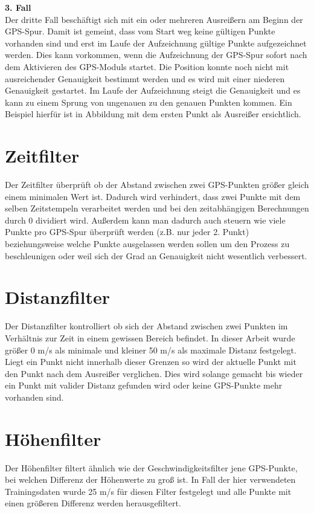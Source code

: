 
\textbf{3. Fall}\\
Der dritte Fall beschäftigt sich mit ein oder mehreren Ausreißern am Beginn der GPS-Spur. Damit ist gemeint, dass vom Start weg keine gültigen Punkte vorhanden sind und erst im Laufe der Aufzeichnung gültige Punkte aufgezeichnet werden. Dies kann vorkommen, wenn die Aufzeichnung der GPS-Spur sofort nach dem Aktivieren des GPS-Moduls startet. Die Position konnte noch nicht mit ausreichender Genauigkeit bestimmt werden und es wird mit einer niederen Genauigkeit gestartet. Im Laufe der Aufzeichnung steigt die Genauigkeit und es kann zu einem Sprung von ungenauen zu den genauen Punkten kommen. Ein Beispiel hierfür ist in Abbildung  mit dem ersten Punkt als Ausreißer ersichtlich.


\section{Zeitfilter}
Der Zeitfilter überprüft ob der Abstand zwischen zwei GPS-Punkten größer gleich einem minimalen Wert ist. Dadurch wird verhindert, dass zwei Punkte mit dem selben Zeitstempeln verarbeitet werden und bei den zeitabhängigen Berechnungen durch 0 dividiert wird. Außerdem kann man dadurch auch steuern wie viele Punkte pro GPS-Spur überprüft werden  (z.B. nur jeder 2. Punkt) beziehungsweise welche Punkte ausgelassen werden sollen um den Prozess zu beschleunigen oder weil sich der Grad an Genauigkeit nicht wesentlich verbessert.

\section{Distanzfilter}
Der Distanzfilter kontrolliert ob sich der Abstand zwischen zwei Punkten im Verhältnis zur Zeit in einem gewissen Bereich befindet. In dieser Arbeit wurde größer 0 m/s als minimale und kleiner 50 m/s als maximale Distanz festgelegt. Liegt ein Punkt nicht innerhalb dieser Grenzen so wird der aktuelle Punkt mit den Punkt nach dem Ausreißer verglichen. Dies wird solange gemacht bis wieder ein Punkt mit valider Distanz gefunden wird oder keine GPS-Punkte mehr vorhanden sind.

\section{Höhenfilter}
Der Höhenfilter filtert ähnlich wie der Geschwindigkeitsfilter jene GPS-Punkte, bei welchen Differenz der Höhenwerte zu groß ist. In Fall der hier verwendeten Trainingsdaten wurde 25 m/s  für diesen Filter festgelegt und alle Punkte mit einen größeren Differenz werden herausgefiltert.


